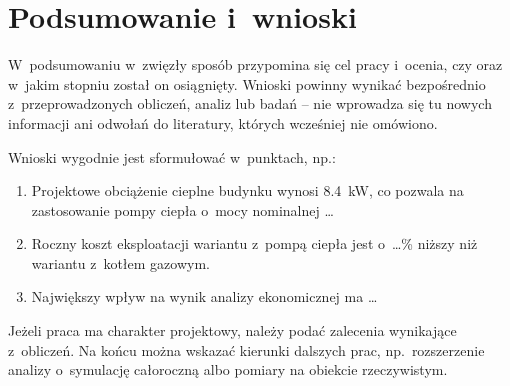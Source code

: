 \chapter{Podsumowanie i~wnioski}
\label{chap:wnioski}

W~podsumowaniu w~zwięzły sposób przypomina się cel pracy i~ocenia, czy oraz
w~jakim stopniu został on osiągnięty. Wnioski powinny wynikać bezpośrednio
z~przeprowadzonych obliczeń, analiz lub badań -- nie wprowadza się tu
nowych informacji ani odwołań do literatury, których wcześniej nie
omówiono.

Wnioski wygodnie jest sformułować w~punktach, np.:
\begin{enumerate}
  \item Projektowe obciążenie cieplne budynku wynosi \qty{8.4}{kW}, co
        pozwala na zastosowanie pompy ciepła o~mocy nominalnej \dots
  \item Roczny koszt eksploatacji wariantu z~pompą ciepła jest o~\dots\%
        niższy niż wariantu z~kotłem gazowym.
  \item Największy wpływ na wynik analizy ekonomicznej ma \dots
\end{enumerate}

Jeżeli praca ma charakter projektowy, należy podać zalecenia wynikające
z~obliczeń. Na końcu można wskazać kierunki dalszych prac, np.\
rozszerzenie analizy o~symulację całoroczną albo pomiary na obiekcie
rzeczywistym.

